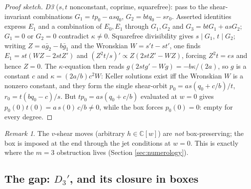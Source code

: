 \documentclass[11pt]{article}
\theoremstyle{definition}
\theoremstyle{remark}
\newtheorem{remark}[theorem]{Remark}
\newcommand{\C}{\mathbb{C}}
\begin{document}
\begin{proof}[Proof sketch]
\emph{D3} ($s,t$ nonconstant, coprime, squarefree): pass to the
shear-invariant combinations $G_1 = tp_0 - asq_0$,
$G_2 = btq_0 - sr_0$. Asserted identities express $E_1$ and a
combination of $E_0, E_1$ through $G_1, G_2$ and
$G_3 = btG_1 + asG_2$; $G_1 = 0$ or $G_2 = 0$ contradict
$\kappa \ne 0$. Squarefree divisibility gives $s \mid G_1$,
$t \mid G_2$; writing $Z = a\bar g_2 - b\bar g_1$ and the Wronskian
$W = s't - st'$, one finds $E_1 = st(WZ - 2stZ')$ and
$(Z^2t/s)' \propto Z(2stZ' - WZ)$, forcing $Z^2t = es$ and hence
$Z = 0$. The $\kappa$-equation then reads
$g(2stg' - Wg) = -b\kappa/(2a)$, so $g$ is a constant $c$ and
$\kappa = (2a/b)c^2W$: Keller solutions exist iff the Wronskian $W$ is
a nonzero constant, and they form the single shear-orbit
$p_0 = as(q_0 + c/b)/t$, $r_0 = t(bq_0 - c)/s$. But $tp_0 =
as(q_0 + c/b)$ evaluated at $w=0$ gives $p_0(0)t(0) = a\,s(0)\,c/b \ne
0$, while the box forces $p_0(0) = 0$: empty for every degree.
\end{proof}

\begin{remark}
The $v$-shear moves (arbitrary $h \in \C[w]$) are \emph{not}
box-preserving; the box is imposed at the end through the jet
conditions at $w = 0$. This is exactly where the $m=3$ obstruction
lives (Section \ref{sec:numerology}).
\end{remark}

\subsection{The gap: \texorpdfstring{$D_3'$}{D3'}, and its closure in
boxes}\label{sec:gap}
\end{document}
